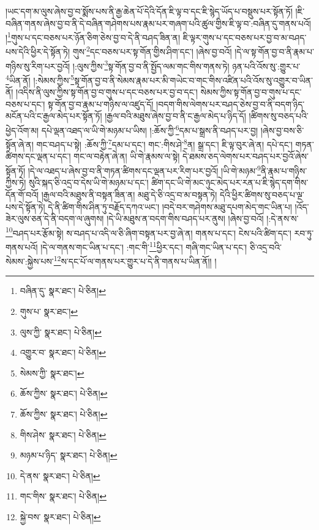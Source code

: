 །ཡང་དག་མ་ལུས་ཞེས་བྱ་བ་སྨོས་པས་ནི་རྒྱ་ཆེན་པོ་དེའི་དོན་ཇི་ལྟ་བ་དང་ཇི་སྙེད་ཡོད་པ་བསྡུས་པར་སྟོན་ཏོ། །ཇི་བཞིན་གནས་ཞེས་བྱ་བ་ནི་དེ་བཞིན་གཤེགས་པས་རྣམ་པར་གཞག་པའི་ཚུལ་གྱིས་ཇི་ལྟ་བ་:བཞིན་དུ་གནས་པའོ། །\footnote{བཞིན་དུ་  སྣར་ཐང་།  པེ་ཅིན། }གུས་པ་དང་བཅས་པར་ཉོན་ཅིག་ཅེས་བྱ་བ་དེ་ནི་བཤད་ཟིན་ན། ཇི་ལྟར་གུས་པ་དང་བཅས་པར་བྱ་བ་མ་བཤད་པས་དེའི་ཕྱིར་དེ་སྟོན་ཏེ། གུས་\footnote{གུས་པ་  སྣར་ཐང་། }དང་བཅས་པར་སྟ་གོན་གྱིས་ཤིག་དང་། །ཞེས་བྱ་བའོ། །དེ་ལ་སྟ་གོན་བྱ་བ་ནི་རྣམ་པ་གཉིས་སུ་རིག་པར་བྱའོ། །:ལུས་ཀྱིས་\footnote{ལུས་ཀྱི་  སྣར་ཐང་།  པེ་ཅིན། }སྟ་གོན་བྱ་བ་ནི་སྤྱོད་ལམ་གང་གིས་གནས་ཏེ། ཉན་པའི་འོས་སུ་:གྱུར་པ་\footnote{འགྱུར་བ་  སྣར་ཐང་།  པེ་ཅིན། }ཡིན་ནོ། །:སེམས་ཀྱིས་\footnote{སེམས་ཀྱི་  སྣར་ཐང་། }སྟ་གོན་བྱ་བ་ནི་སེམས་རྣམ་པར་མི་གཡེང་བ་གང་གིས་འཛིན་པའི་འོས་སུ་འགྱུར་བ་ཡིན་ནོ། །འདིས་ནི་ལུས་ཀྱིས་སྟ་གོན་བྱ་བ་གུས་པ་དང་བཅས་པར་བྱ་བ་དང་། སེམས་ཀྱིས་སྟ་གོན་བྱ་བ་གུས་པ་དང་བཅས་པ་དང་། སྟ་གོན་བྱ་བ་རྣམ་པ་གཉིས་ལ་འཛུད་དོ། །བདག་གིས་ལེགས་པར་བཤད་ཅེས་བྱ་བ་ནི་བདག་ཉིད་མངོན་པའི་ང་རྒྱལ་མེད་པར་སྟོན་ཏོ། །རྒྱལ་བའི་མཐུས་ཞེས་བྱ་བ་ནི་ང་རྒྱལ་མེད་པ་ཉིད་དོ། །ཚིགས་སུ་བཅད་པའི་ཕྱེད་འོག་མ། དཔེ་ལྡན་འཐད་ལ་ཡི་གེ་མཉམ་པ་ཡིས། །:ཆོས་ཀྱི་\footnote{ཆོས་ཀྱིས་  སྣར་ཐང་།  པེ་ཅིན། }དམ་པ་སྒྲས་ནི་བཤད་པར་བྱ། །ཞེས་བྱ་བས་ཅི་སྟོན་ཞེ་ན། གང་བཤད་པ་སྟེ། :ཆོས་ཀྱི་\footnote{ཆོས་ཀྱིས་  སྣར་ཐང་།  པེ་ཅིན། }དམ་པ་དང་། གང་:གིས་ཤེ་\footnote{གིས་ཤེས་  སྣར་ཐང་།  པེ་ཅིན། }ན། སྒྲ་དང་། ཇི་ལྟ་བུར་ཞེ་ན། དཔེ་དང་། གཏན་ཚིགས་དང་ལྡན་པ་དང་། གང་ལ་བརྟེན་ཞེ་ན། ཡི་གེ་རྣམས་ལ་སྟེ། དེ་ཐམས་ཅད་ལེགས་པར་བཤད་པར་བྱའོ་ཞེས་སྟོན་ཏོ། །དེ་ལ་འཐད་པ་ཞེས་བྱ་བ་ནི་གཏན་ཚིགས་དང་ལྡན་པར་རིག་པར་བྱའོ། །ཡི་གེ་མཉམ་\footnote{མཉམ་པ་ཉིད་  སྣར་ཐང་།  པེ་ཅིན། }ནི་རྣམ་པ་གཉིས་ཀྱིས་ཏེ། སུའི་སྐད་ཅི་འདྲ་བ་དེས་ཡི་གེ་མཉམ་པ་དང་། ཚིག་དང་ཡི་གེ་མང་ཉུང་མེད་པར་རན་པ་ཇི་སྙེད་དག་གིས་དོན་གོ་བའོ། །རྒྱལ་བའི་མཐུས་ནི་བསྟན་ཟིན་ན། མཐུ་དེ་ཅི་འདྲ་བ་མ་བསྟན་ཏེ། དེའི་ཕྱིར་ཚིགས་སུ་བཅད་པ་ལྔ་པས་དེ་སྟོན་ཏེ། དེ་ནི་ཚིག་གིས་ཤིན་ཏུ་བརྗོད་དཀའ་ཡང་། །བདེ་བར་གཤེགས་མཐུ་དཔག་མེད་གང་ཡིན་པ། །འོད་ཟེར་ལུས་ཅན་དེ་ནི་བདག་ལ་ཞུགས། །དེ་ཡི་མཐུས་ན་བདག་གིས་བཤད་པར་ནུས། །ཞེས་བྱ་བའོ། །:དེ་ནས་ས་\footnote{དེ་ནས་  སྣར་ཐང་།  པེ་ཅིན། }བཤད་པར་རྩོམ་སྟེ། ས་བཤད་པ་འདི་ལ་ཅི་ཞིག་བསྟན་པར་བྱ་ཞེ་ན། གནས་པ་དང་། ངེས་པའི་ཚིག་དང་། རབ་ཏུ་གནས་པའོ། །དེ་ལ་གནས་གང་ཡིན་པ་དང་། :གང་གི་\footnote{གང་གིས་  སྣར་ཐང་།  པེ་ཅིན། }ཕྱིར་དང་། གཞི་གང་ཡིན་པ་དང་། ཅི་འདྲ་བའི་སེམས་:སྐྱེས་པས་\footnote{སྐྱེ་བས་  སྣར་ཐང་།  པེ་ཅིན། }ས་དང་པོ་ལ་གནས་པར་གྱུར་པ་དེ་ནི་གནས་པ་ཡིན་ནོ།། །
